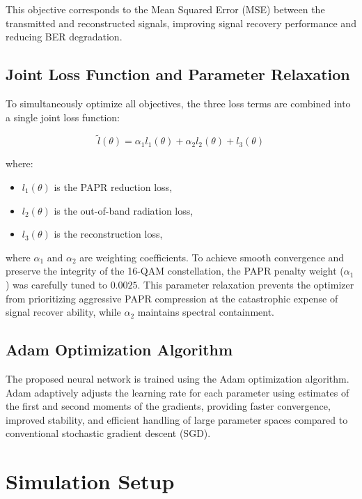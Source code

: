 This objective corresponds to the Mean Squared Error (MSE) between the transmitted and reconstructed signals, improving signal recovery performance and reducing BER degradation.

\subsection{Joint Loss Function and Parameter Relaxation}

To simultaneously optimize all objectives, the three loss terms are combined into a single joint loss function:

\begin{equation*}
    \tilde{l}(\theta)=\alpha_1 l_1(\theta)+\alpha_2 l_2(\theta)+l_3(\theta)
\end{equation*}

where:

\begin{itemize}
    \item $l_1(\theta)$ is the PAPR reduction loss,
    \item $l_2(\theta)$ is the out-of-band radiation loss,
    \item $l_3(\theta)$ is the reconstruction loss,
\end{itemize}


where $\alpha_1$ and $\alpha_2$ are weighting coefficients. To achieve smooth convergence and preserve the integrity of the 16-QAM constellation, the PAPR penalty weight ($\alpha_1$) was carefully tuned to $0.0025$. This parameter relaxation prevents the optimizer from prioritizing aggressive PAPR compression at the catastrophic expense of signal recover ability, while $\alpha_2$ maintains spectral containment.

\subsection{Adam Optimization Algorithm}

The proposed neural network is trained using the Adam optimization algorithm. Adam adaptively adjusts the learning rate for each parameter using estimates of the first and second moments of the gradients, providing faster convergence, improved stability, and efficient handling of large parameter spaces compared to conventional stochastic gradient descent (SGD).

\section{Simulation Setup}

